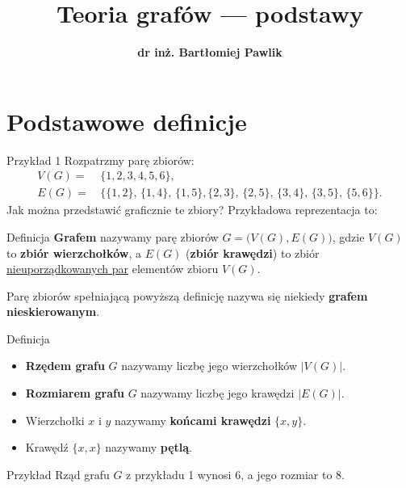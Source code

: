 \documentclass[a4paper,10pt]{beamer}
\title{\bf Teoria grafów --- podstawy}
\author[B. Pawlik]{\bf dr inż. Bartłomiej Pawlik}
\begin{document}
\begin{frame}
\titlepage
\end{frame}


\section{Podstawowe definicje}


\begin{frame}
	
	\begin{exampleblock}{Przykład 1}
	Rozpatrzmy parę zbiorów:
\begin{align*}
V(G)=&\,\{1,2,3,4,5,6\},\\
E(G)=&\,\Big\{\{1,2\},\,\{1,4\},\,\{1,5\},\{2,3\},\,\{2,5\},\,\{3,4\},\,\{3,5\},\,\{5,6\}\Big\}.
\end{align*}
Jak można przedstawić graficznie te zbiory? Przykładowa reprezentacja to:
	\begin{center}
		
	\end{center}
	\end{exampleblock}
	
\end{frame}


\begin{frame}
	
	\begin{block}{Definicja}
		{\bf Grafem} nazywamy parę zbiorów $G=\big(V(G),E(G)\big)$, gdzie $V(G)$ to {\bf zbiór wierzchołków}, a $E(G)$ ({\bf zbiór krawędzi}) to zbiór \underline{nieuporządkowanych par} elementów zbioru $V(G)$.
	\end{block}

\medskip

Parę zbiorów spełniającą powyższą definicję nazywa się niekiedy {\bf grafem nieskierowanym}.

\medskip
		
\begin{block}{Definicja}
\begin{itemize}
	\item {\bf Rzędem grafu} $G$ nazywamy liczbę jego wierzchołków $|V(G)|$. 
	\item {\bf Rozmiarem grafu} $G$ nazywamy liczbę jego krawędzi $|E(G)|$.
	\item	Wierzchołki $x$ i $y$ nazywamy {\bf końcami krawędzi} $\{x,y\}$. 
	\item Krawędź $\{x,x\}$ nazywamy {\bf pętlą}.
\end{itemize}
\end{block}

\begin{exampleblock}{Przykład}
	Rząd grafu $G$ z przykładu 1 wynosi $6$, a jego rozmiar to $8$.
\end{exampleblock}



\end{frame}
\end{document}
